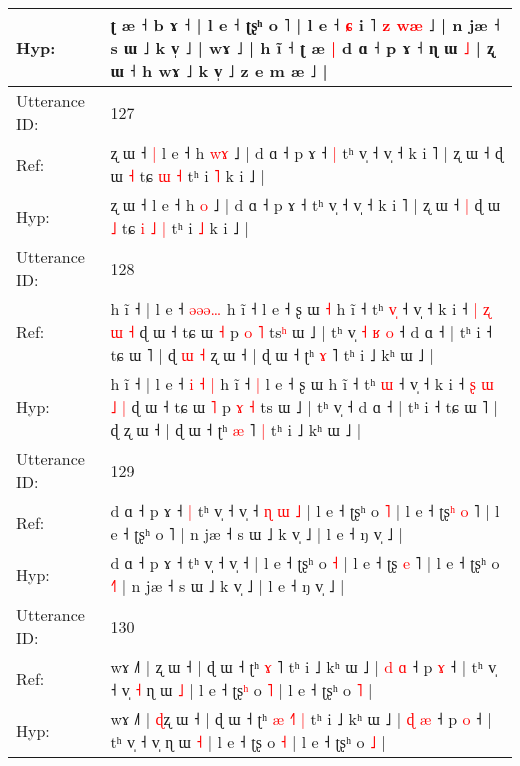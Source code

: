 \documentclass[10pt]{article}
\DeclareRobustCommand{\hl}[1]{{\textcolor{red}{#1}}}
\begin{document}
\begin{longtable}{ll}
 \\
Hyp: & ʈ æ ˧ b ɤ ˧ | l e ˧ ʈʂʰ o ˥ | l e ˧ \hl{ɕ} i ˥ \hl{z} \hl{w}\hl{æ} ˩ | n jæ ˧ s ɯ ˩ k v̩ ˩ | wɤ ˩\hl{} | h ĩ ˧\hl{}\hl{} ʈ æ\hl{}\hl{} \hl{}\hl{}\hl{}\hl{|} d ɑ ˧ p ɤ ˧ ɳ ɯ \hl{˩} | ʐ ɯ ˧ h wɤ ˩ k v̩ ˩ z e\hl{}\hl{} m æ ˩ |
 \\
\midrule
Utterance ID: & 127 \\
Ref: & ʐ ɯ ˧\hl{ }\hl{|} l e ˧ h \hl{w}\hl{ɤ} ˩ | d ɑ ˧ p ɤ ˧\hl{ }\hl{|} tʰ v̩ ˧ v̩ ˧ k i ˥ | ʐ ɯ ˧\hl{}\hl{} ɖ ɯ \hl{˧} tɕ\hl{}\hl{} \hl{ɯ} \hl{˧} tʰ i \hl{˥} k i ˩ |
 \\
Hyp: & ʐ ɯ ˧\hl{}\hl{} l e ˧ h \hl{}\hl{o} ˩ | d ɑ ˧ p ɤ ˧\hl{}\hl{} tʰ v̩ ˧ v̩ ˧ k i ˥ | ʐ ɯ ˧\hl{ }\hl{|} ɖ ɯ \hl{˩} tɕ\hl{ }\hl{i} \hl{˩} \hl{|} tʰ i \hl{˩} k i ˩ |
 \\
\midrule
Utterance ID: & 128 \\
Ref: & h ĩ ˧ | l e ˧ \hl{}\hl{ə}\hl{ə}\hl{ə}\hl{…} h ĩ ˧\hl{}\hl{} l e ˧ ʂ ɯ\hl{ }\hl{˧} h ĩ ˧ tʰ \hl{v}\hl{̩} ˧ v̩ ˧ k i ˧ \hl{|} \hl{ʐ} \hl{ɯ} \hl{˧} ɖ ɯ ˧ tɕ ɯ \hl{˧} p \hl{o} \hl{˥} ts\hl{ʰ} ɯ ˩ | tʰ v̩\hl{ }\hl{˧}\hl{ }\hl{ʁ}\hl{ }\hl{o} ˧ d ɑ ˧ | tʰ i ˧ tɕ ɯ ˥ | ɖ\hl{ }\hl{ɯ}\hl{ }\hl{˧} ʐ ɯ ˧ | ɖ ɯ ˧ ʈʰ \hl{ɤ} ˥\hl{}\hl{} tʰ i ˩ kʰ ɯ ˩ |
 \\
Hyp: & h ĩ ˧ | l e ˧ \hl{i}\hl{ }\hl{˧}\hl{ }\hl{|} h ĩ ˧\hl{ }\hl{|} l e ˧ ʂ ɯ\hl{}\hl{} h ĩ ˧ tʰ \hl{}\hl{ɯ} ˧ v̩ ˧ k i ˧ \hl{ʂ} \hl{ɯ} \hl{˩} \hl{|} ɖ ɯ ˧ tɕ ɯ \hl{˥} p \hl{ɤ} \hl{˧} ts\hl{} ɯ ˩ | tʰ v̩\hl{}\hl{}\hl{}\hl{}\hl{}\hl{} ˧ d ɑ ˧ | tʰ i ˧ tɕ ɯ ˥ | ɖ\hl{}\hl{}\hl{}\hl{} ʐ ɯ ˧ | ɖ ɯ ˧ ʈʰ \hl{æ} ˥\hl{ }\hl{|} tʰ i ˩ kʰ ɯ ˩ |
 \\
\midrule
Utterance ID: & 129 \\
Ref: & d ɑ ˧ p ɤ ˧\hl{ }\hl{|} tʰ v̩ ˧ v̩ ˧\hl{ }\hl{ɳ}\hl{ }\hl{ɯ}\hl{ }\hl{˩} | l e ˧ ʈʂʰ o \hl{˥} | l e ˧ ʈʂ\hl{ʰ} \hl{o} ˥ | l e ˧ ʈʂʰ o \hl{}˥ | n jæ ˧ s ɯ ˩ k v̩ ˩ | l e ˧ ŋ v̩ ˩ |
 \\
Hyp: & d ɑ ˧ p ɤ ˧\hl{}\hl{} tʰ v̩ ˧ v̩ ˧\hl{}\hl{}\hl{}\hl{}\hl{}\hl{} | l e ˧ ʈʂʰ o \hl{˧} | l e ˧ ʈʂ\hl{} \hl{e} ˥ | l e ˧ ʈʂʰ o \hl{˧}˥ | n jæ ˧ s ɯ ˩ k v̩ ˩ | l e ˧ ŋ v̩ ˩ |
 \\
\midrule
Utterance ID: & 130 \\
Ref: & wɤ ˩˥ | \hl{}ʐ ɯ ˧ | ɖ ɯ ˧ ʈʰ \hl{ɤ} \hl{}˥\hl{}\hl{} tʰ i ˩ kʰ ɯ ˩ | \hl{d} \hl{ɑ} ˧ p \hl{ɤ} ˧ | tʰ v̩ ˧ v̩\hl{ }\hl{˧} ɳ ɯ \hl{˩} | l e ˧ ʈʂ\hl{ʰ} o \hl{˥} | l e ˧ ʈʂʰ o \hl{˥} |
 \\
Hyp: & wɤ ˩˥ | \hl{ɖ}ʐ ɯ ˧ | ɖ ɯ ˧ ʈʰ \hl{æ} \hl{˧}˥\hl{ }\hl{|} tʰ i ˩ kʰ ɯ ˩ | \hl{ɖ} \hl{æ} ˧ p \hl{o} ˧ | tʰ v̩ ˧ v̩\hl{}\hl{} ɳ ɯ \hl{˧} | l e ˧ ʈʂ\hl{} o \hl{˧} | l e ˧ ʈʂʰ o \hl{˩} |

\end{longtable}
\end{document}
